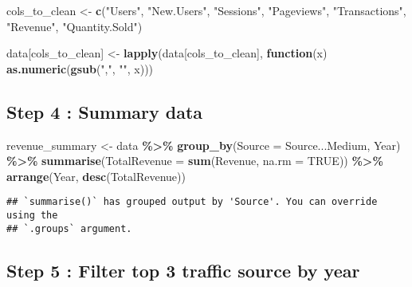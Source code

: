 \documentclass[
]{article}
\newenvironment{Shaded}{\begin{snugshade}}{\end{snugshade}}
\newcommand{\AttributeTok}[1]{\textcolor[rgb]{0.13,0.29,0.53}{#1}}
\newcommand{\ConstantTok}[1]{\textcolor[rgb]{0.56,0.35,0.01}{#1}}
\newcommand{\ControlFlowTok}[1]{\textcolor[rgb]{0.13,0.29,0.53}{\textbf{#1}}}
\newcommand{\FunctionTok}[1]{\textcolor[rgb]{0.13,0.29,0.53}{\textbf{#1}}}
\newcommand{\NormalTok}[1]{#1}
\newcommand{\OtherTok}[1]{\textcolor[rgb]{0.56,0.35,0.01}{#1}}
\newcommand{\SpecialCharTok}[1]{\textcolor[rgb]{0.81,0.36,0.00}{\textbf{#1}}}
\newcommand{\StringTok}[1]{\textcolor[rgb]{0.31,0.60,0.02}{#1}}
\begin{document}
\begin{Shaded}
\begin{Highlighting}[]
\NormalTok{cols\_to\_clean }\OtherTok{\textless{}{-}} \FunctionTok{c}\NormalTok{(}\StringTok{"Users"}\NormalTok{, }\StringTok{"New.Users"}\NormalTok{, }\StringTok{"Sessions"}\NormalTok{, }\StringTok{"Pageviews"}\NormalTok{, }
                   \StringTok{"Transactions"}\NormalTok{, }\StringTok{"Revenue"}\NormalTok{, }\StringTok{"Quantity.Sold"}\NormalTok{)}

\NormalTok{data[cols\_to\_clean] }\OtherTok{\textless{}{-}} \FunctionTok{lapply}\NormalTok{(data[cols\_to\_clean], }\ControlFlowTok{function}\NormalTok{(x) }\FunctionTok{as.numeric}\NormalTok{(}\FunctionTok{gsub}\NormalTok{(}\StringTok{","}\NormalTok{, }\StringTok{""}\NormalTok{, x)))}
\end{Highlighting}
\end{Shaded}

\subsection{Step 4 : Summary data}\label{step-4-summary-data}

\begin{Shaded}
\begin{Highlighting}[]
\NormalTok{revenue\_summary }\OtherTok{\textless{}{-}}\NormalTok{ data }\SpecialCharTok{\%\textgreater{}\%}
  \FunctionTok{group\_by}\NormalTok{(}\AttributeTok{Source =} \StringTok{\textasciigrave{}}\AttributeTok{Source...Medium}\StringTok{\textasciigrave{}}\NormalTok{, Year) }\SpecialCharTok{\%\textgreater{}\%}
  \FunctionTok{summarise}\NormalTok{(}\AttributeTok{TotalRevenue =} \FunctionTok{sum}\NormalTok{(Revenue, }\AttributeTok{na.rm =} \ConstantTok{TRUE}\NormalTok{)) }\SpecialCharTok{\%\textgreater{}\%}
  \FunctionTok{arrange}\NormalTok{(Year, }\FunctionTok{desc}\NormalTok{(TotalRevenue))}
\end{Highlighting}
\end{Shaded}

\begin{verbatim}
## `summarise()` has grouped output by 'Source'. You can override using the
## `.groups` argument.
\end{verbatim}

\subsection{Step 5 : Filter top 3 traffic source by
year}\label{step-5-filter-top-3-traffic-source-by-year}
\end{document}
